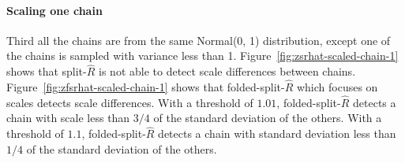 \documentclass[american,]{article}
\let\oldparagraph\paragraph
\renewcommand{\paragraph}[1]{\oldparagraph{#1}\mbox{}}
\begin{document}
\hypertarget{scaling-one-chain}{%
\paragraph{Scaling one chain}\label{scaling-one-chain}}

Third all the chains are from the same Normal(0, 1) distribution,
except one of the chains is sampled with variance less than 1.
Figure~\ref{fig:zsrhat-scaled-chain-1} shows that
split-\(\widehat{R}\) is not able to detect scale differences between
chains.
%
Figure~\ref{fig:zfsrhat-scaled-chain-1} shows that
folded-split-\(\widehat{R}\) which focuses on scales detects scale
differences. With a threshold of \(1.01\),
folded-split-\(\widehat{R}\) detects a chain with scale less than
\(3/4\) of the standard deviation of the others. With a threshold of
\(1.1\), folded-split-\(\widehat{R}\) detects a chain with standard
deviation less than \(1/4\) of the standard deviation of the others.
\end{document}
